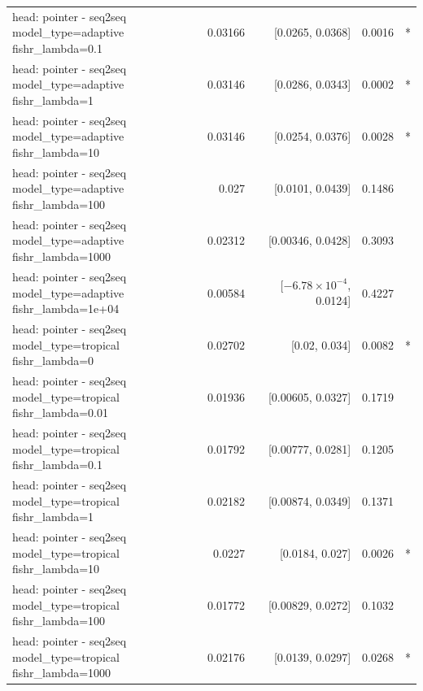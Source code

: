 \documentclass[10pt]{article}
\makeatletter
\newcommand{\stackcell}[1]{\begin{tabular}[t]{@{}l@{}}#1\end{tabular}}
\makeatother
\begin{document}
{\begin{longtable}{lrrrl}
\stackcell{head: pointer - seq2seq\\\footnotesize model\_type=adaptive fishr\_lambda=0.1 } & 0.03166 & [0.0265, 0.0368] & 0.0016 & *\\
\stackcell{head: pointer - seq2seq\\\footnotesize model\_type=adaptive fishr\_lambda=1 } & 0.03146 & [0.0286, 0.0343] & 0.0002 & *\\
\stackcell{head: pointer - seq2seq\\\footnotesize model\_type=adaptive fishr\_lambda=10 } & 0.03146 & [0.0254, 0.0376] & 0.0028 & *\\
\stackcell{head: pointer - seq2seq\\\footnotesize model\_type=adaptive fishr\_lambda=100 } & 0.027 & [0.0101, 0.0439] & 0.1486 & \\
\stackcell{head: pointer - seq2seq\\\footnotesize model\_type=adaptive fishr\_lambda=1000 } & 0.02312 & [0.00346, 0.0428] & 0.3093 & \\
\stackcell{head: pointer - seq2seq\\\footnotesize model\_type=adaptive fishr\_lambda=1e+04 } & 0.00584 & [$-6.78\times10^{-4}$, 0.0124] & 0.4227 & \\
\stackcell{head: pointer - seq2seq\\\footnotesize model\_type=tropical fishr\_lambda=0 } & 0.02702 & [0.02, 0.034] & 0.0082 & *\\
\stackcell{head: pointer - seq2seq\\\footnotesize model\_type=tropical fishr\_lambda=0.01 } & 0.01936 & [0.00605, 0.0327] & 0.1719 & \\
\stackcell{head: pointer - seq2seq\\\footnotesize model\_type=tropical fishr\_lambda=0.1 } & 0.01792 & [0.00777, 0.0281] & 0.1205 & \\
\stackcell{head: pointer - seq2seq\\\footnotesize model\_type=tropical fishr\_lambda=1 } & 0.02182 & [0.00874, 0.0349] & 0.1371 & \\
\stackcell{head: pointer - seq2seq\\\footnotesize model\_type=tropical fishr\_lambda=10 } & 0.0227 & [0.0184, 0.027] & 0.0026 & *\\
\stackcell{head: pointer - seq2seq\\\footnotesize model\_type=tropical fishr\_lambda=100 } & 0.01772 & [0.00829, 0.0272] & 0.1032 & \\
\stackcell{head: pointer - seq2seq\\\footnotesize model\_type=tropical fishr\_lambda=1000 } & 0.02176 & [0.0139, 0.0297] & 0.0268 & *\\

\end{longtable}}
\end{document}
